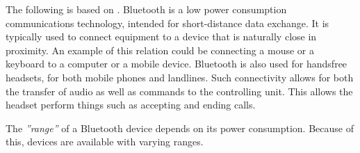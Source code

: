 The following is based on \citet{ieee_bluetooth_standard}.
Bluetooth is a low power consumption communications technology, intended for short-distance data exchange.
It is typically used to connect equipment to a device that is naturally close in proximity.
An example of this relation could be connecting a mouse or a keyboard to a computer or a mobile device.
Bluetooth is also used for handsfree headsets, for both mobile phones and landlines.
Such connectivity allows for both the transfer of audio as well as commands to the controlling unit.
This allows the headset perform things such as accepting and ending calls.

The \textit{''range''} of a Bluetooth device depends on its power consumption.
Because of this, devices are available with varying ranges.